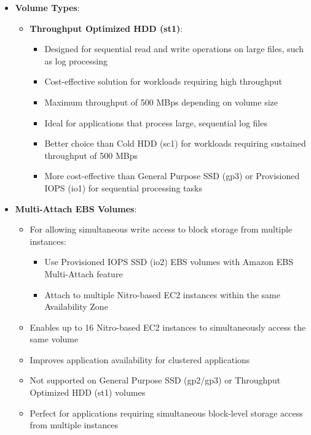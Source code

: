 \documentclass[11pt,a4paper]{report}
\begin{document}
\begin{itemize}
\begin{itemize}
\begin{itemize}
  \item Best suited for workloads with infrequently accessed data
  \item Cannot meet high IOPS requirements reliably or cost-effectively
\end{itemize}
\end{itemize}
  \item \textbf{Volume Types}:
\begin{itemize}
  \item \textbf{Throughput Optimized HDD (st1)}:
\begin{itemize}
  \item Designed for sequential read and write operations on large files, such as log processing
  \item Cost-effective solution for workloads requiring high throughput
  \item Maximum throughput of 500 MBps depending on volume size
  \item Ideal for applications that process large, sequential log files
  \item Better choice than Cold HDD (sc1) for workloads requiring sustained throughput of 500 MBps
  \item More cost-effective than General Purpose SSD (gp3) or Provisioned IOPS (io1) for sequential processing tasks
\end{itemize}
\end{itemize}
  \item \textbf{Multi-Attach EBS Volumes}:
\begin{itemize}
  \item For allowing simultaneous write access to block storage from multiple instances:
\begin{itemize}
  \item Use Provisioned IOPS SSD (io2) EBS volumes with Amazon EBS Multi-Attach feature
  \item Attach to multiple Nitro-based EC2 instances within the same Availability Zone
\end{itemize}
  \item Enables up to 16 Nitro-based EC2 instances to simultaneously access the same volume
  \item Improves application availability for clustered applications
  \item Not supported on General Purpose SSD (gp2/gp3) or Throughput Optimized HDD (st1) volumes
  \item Perfect for applications requiring simultaneous block-level storage access from multiple instances

\end{itemize}
\end{itemize}
\end{document}

